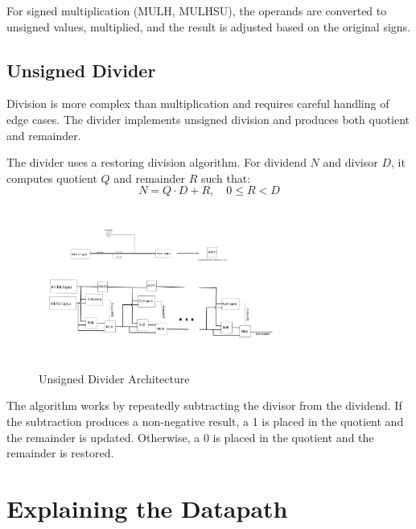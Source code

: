 \documentclass{article}
\begin{document}
For signed multiplication (MULH, MULHSU), the operands are converted to unsigned values, multiplied, and the result is adjusted based on the original signs.

\subsection*{Unsigned Divider}

Division is more complex than multiplication and requires careful handling of edge cases. The divider implements unsigned division and produces both quotient and remainder.

The divider uses a restoring division algorithm. For dividend \(N\) and divisor \(D\), it computes quotient \(Q\) and remainder \(R\) such that:
\[
N = Q \cdot D + R, \quad 0 \leq R < D
\]

\begin{figure}[H]
    \centering
    \includegraphics[width=0.7\textwidth]{Unsigned_divider.png}
    \caption{Unsigned Divider Architecture}
    \label{fig:divider}
\end{figure}

The algorithm works by repeatedly subtracting the divisor from the dividend. If the subtraction produces a non-negative result, a 1 is placed in the quotient and the remainder is updated. Otherwise, a 0 is placed in the quotient and the remainder is restored.
\section*{Explaining the Datapath}
\end{document}
